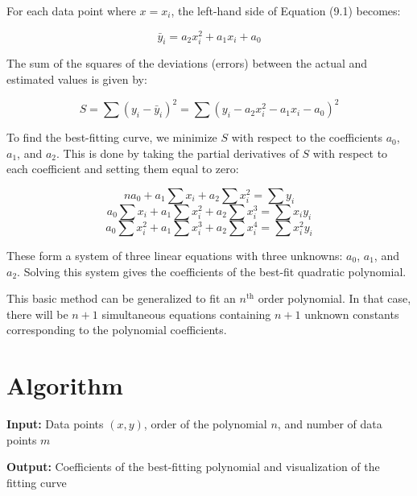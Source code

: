 \documentclass[a4paper,12pt]{article}
\begin{document}
	For each data point where \( x = x_i \), the left-hand side of Equation (9.1) becomes:
	
	\begin{equation}
		\bar{y}_i = a_2x_i^2 + a_1x_i + a_0 \tag{9.2}
	\end{equation}
	
	The sum of the squares of the deviations (errors) between the actual and estimated values is given by:
	
	\begin{equation}
		S = \sum (y_i - \bar{y}_i)^2 = \sum (y_i - a_2x_i^2 - a_1x_i - a_0)^2 \tag{9.3}
	\end{equation}
	
	To find the best-fitting curve, we minimize \( S \) with respect to the coefficients \( a_0 \), \( a_1 \), and \( a_2 \). This is done by taking the partial derivatives of \( S \) with respect to each coefficient and setting them equal to zero:
	
	\begin{equation}
		n a_0 + a_1 \sum x_i + a_2 \sum x_i^2 = \sum y_i \tag{9.4}
	\end{equation}
	\begin{equation}
		a_0 \sum x_i + a_1 \sum x_i^2 + a_2 \sum x_i^3 = \sum x_i y_i \tag{9.5}
	\end{equation}
	\begin{equation}
		a_0 \sum x_i^2 + a_1 \sum x_i^3 + a_2 \sum x_i^4 = \sum x_i^2 y_i \tag{9.6}
	\end{equation}
	
	These form a system of three linear equations with three unknowns: \( a_0 \), \( a_1 \), and \( a_2 \). Solving this system gives the coefficients of the best-fit quadratic polynomial.
	
	This basic method can be generalized to fit an \( n^{\text{th}} \) order polynomial. In that case, there will be \( n+1 \) simultaneous equations containing \( n+1 \) unknown constants corresponding to the polynomial coefficients.
	
\section{Algorithm}

\textbf{Input:} Data points \( (x, y) \), order of the polynomial \( n \), and number of data points \( m \)

\textbf{Output:} Coefficients of the best-fitting polynomial and visualization of the fitting curve
\end{document}
